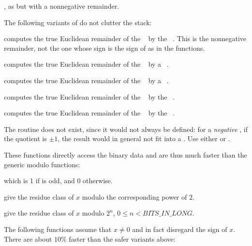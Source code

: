 , as  but with a
nonnegative remainder.

 The following variants of  do not
clutter the stack:

 computes the true Euclidean
remainder of the ~ by the ~. This is the
nonnegative remainder, not the one whose sign is the sign of 
as in the  functions.

 computes the true Euclidean
remainder of the ~ by a ~.

 computes the true Euclidean
remainder of the ~ by a ~.

 computes the true Euclidean
remainder of the ~ by the ~.

 computes the true Euclidean
remainder of the ~ by the ~.

The routine  does not exist, since it would not always be
defined: for a \emph{negative} , if the quotient is $\pm1$, the result
 would in general not fit into a . Use either
 or .

These functions directly access the binary data and are thus much faster than
the generic modulo functions:

 which is 1 if  is odd, and 0 otherwise.






 give the residue class of $x$ modulo the
corresponding power of $2$.

 give the residue class of $x$ modulo
$2^n$, $0 \leq n < BITS\_IN\_LONG$.

The following functions assume that $x\neq 0$ and in fact disregard the
sign of $x$. There are about $10\%$ faster than the safer variants above:


